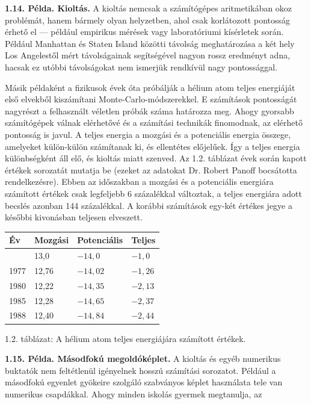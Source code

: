 \documentclass[
  magyar,
  11pt]{article}
\begin{document}
\textbf{1.14. Példa. Kioltás.} A kioltás nemcsak a számítógépes
aritmetikában okoz problémát, hanem bármely olyan helyzetben, ahol csak
korlátozott pontosság érhető el --- például empirikus mérések vagy
laboratóriumi kísérletek során. Például Manhattan és Staten Island
közötti távolság meghatározása a két hely Los Angelestől mért
távolságainak segítségével nagyon rossz eredményt adna, hacsak ez utóbbi
távolságokat nem ismerjük rendkívül nagy pontossággal.

Másik példaként a fizikusok évek óta próbálják a hélium atom teljes
energiáját első elvekből kiszámítani Monte-Carlo-módszerekkel. E
számítások pontosságát nagyrészt a felhasznált véletlen próbák száma
határozza meg. Ahogy gyorsabb számítógépek válnak elérhetővé és a
számítási technikák finomodnak, az elérhető pontosság is javul. A teljes
energia a mozgási és a potenciális energia összege, amelyeket
külön-külön számítanak ki, és ellentétes előjelűek. Így a teljes energia
különbségként áll elő, és kioltás miatt szenved. Az 1.2. táblázat évek
során kapott értékek sorozatát mutatja be (ezeket az adatokat Dr. Robert
Panoff bocsátotta rendelkezésre). Ebben az időszakban a mozgási és a
potenciális energiára számított értékek csak legfeljebb 6 százalékkal
változtak, a teljes energiára adott becslés azonban 144 százalékkal. A
korábbi számítások egy-két értékes jegye a későbbi kivonásban teljesen
elveszett.

\begin{longtable}[]{@{}llll@{}}
\toprule\noalign{}
Év & Mozgási & Potenciális & Teljes \\
\midrule\noalign{}
\endhead
\bottomrule\noalign{}
\endlastfoot
1971 & 13,0 & \(-14{,}0\) & \(-1{,}0\) \\
1977 & 12,76 & \(-14{,}02\) & \(-1{,}26\) \\
1980 & 12,22 & \(-14{,}35\) & \(-2{,}13\) \\
1985 & 12,28 & \(-14{,}65\) & \(-2{,}37\) \\
1988 & 12,40 & \(-14{,}84\) & \(-2{,}44\) \\
\end{longtable}

1.2. táblázat: A hélium atom teljes energiájára számított értékek.

\textbf{1.15. Példa. Másodfokú megoldóképlet.} A kioltás és egyéb
numerikus buktatók nem feltétlenül igényelnek hosszú számítási
sorozatot. Például a másodfokú egyenlet gyökeire szolgáló szabványos
képlet használata tele van numerikus csapdákkal. Ahogy minden iskolás
gyermek megtanulja, az
\end{document}
